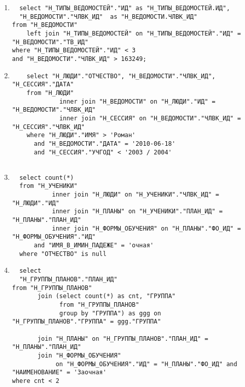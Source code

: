 \documentclass{article}
\begin{document}
\begin{enumerate}
  \item \begin{lstlisting}
  select "Н_ТИПЫ_ВЕДОМОСТЕЙ"."ИД" as "Н_ТИПЫ_ВЕДОМОСТЕЙ.ИД",
  "Н_ВЕДОМОСТИ"."ЧЛВК_ИД"  as "Н_ВЕДОМОСТИ.ЧЛВК_ИД"
from "Н_ВЕДОМОСТИ"
    left join "Н_ТИПЫ_ВЕДОМОСТЕЙ" on "Н_ТИПЫ_ВЕДОМОСТЕЙ"."ИД" = "Н_ВЕДОМОСТИ"."ТВ_ИД"
where "Н_ТИПЫ_ВЕДОМОСТЕЙ"."ИД" < 3
and "Н_ВЕДОМОСТИ"."ЧЛВК_ИД" > 163249;
\end{lstlisting}
        
        
  \item \begin{lstlisting}
    select "Н_ЛЮДИ"."ОТЧЕСТВО", "Н_ВЕДОМОСТИ"."ЧЛВК_ИД", "Н_СЕССИЯ"."ДАТА"
    from "Н_ЛЮДИ"
             inner join "Н_ВЕДОМОСТИ" on "Н_ЛЮДИ"."ИД" = "Н_ВЕДОМОСТИ"."ЧЛВК_ИД"
             inner join "Н_СЕССИЯ" on "Н_ВЕДОМОСТИ"."ЧЛВК_ИД" = "Н_СЕССИЯ"."ЧЛВК_ИД"
    where "Н_ЛЮДИ"."ИМЯ" > 'Роман'
      and "Н_ВЕДОМОСТИ"."ДАТА" = '2010-06-18'
      and "Н_СЕССИЯ"."УЧГОД" < '2003 / 2004'
    
\end{lstlisting}
        
  \item \begin{lstlisting}
  select count(*)
  from "Н_УЧЕНИКИ"
           inner join "Н_ЛЮДИ" on "Н_УЧЕНИКИ"."ЧЛВК_ИД" = "Н_ЛЮДИ"."ИД"
           inner join "Н_ПЛАНЫ" on "Н_УЧЕНИКИ"."ПЛАН_ИД" = "Н_ПЛАНЫ"."ПЛАН_ИД"
           inner join "Н_ФОРМЫ_ОБУЧЕНИЯ" on "Н_ПЛАНЫ"."ФО_ИД" = "Н_ФОРМЫ_ОБУЧЕНИЯ"."ИД"
      and "ИМЯ_В_ИМИН_ПАДЕЖЕ" = 'очная'
  where "ОТЧЕСТВО" is null
\end{lstlisting}
        
        
  \item \begin{lstlisting}
  select
  "Н_ГРУППЫ_ПЛАНОВ"."ПЛАН_ИД"
from "Н_ГРУППЫ_ПЛАНОВ"
       join (select count(*) as cnt, "ГРУППА"
             from "Н_ГРУППЫ_ПЛАНОВ"
             group by "ГРУППА") as ggg on "Н_ГРУППЫ_ПЛАНОВ"."ГРУППА" = ggg."ГРУППА"

       join "Н_ПЛАНЫ" on "Н_ГРУППЫ_ПЛАНОВ"."ПЛАН_ИД" = "Н_ПЛАНЫ"."ПЛАН_ИД"
       join "Н_ФОРМЫ_ОБУЧЕНИЯ"
            on "Н_ФОРМЫ_ОБУЧЕНИЯ"."ИД" = "Н_ПЛАНЫ"."ФО_ИД" and "НАИМЕНОВАНИЕ" = 'Заочная'
where cnt < 2
\end{lstlisting}
        
        
        

\end{enumerate}
\end{document}
